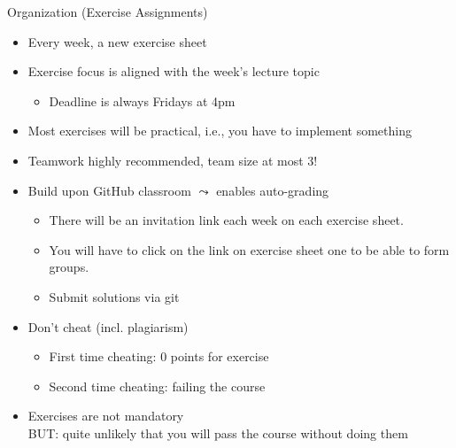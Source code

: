 \documentclass[aspectratio=169]{../latex_main/tntbeamer}  %
\begin{document}
\begin{frame}[c]{Organization (Exercise Assignments)}
	
	\begin{itemize}
	\item Every week, a new exercise sheet
		\item Exercise focus is aligned with the week's lecture topic
		\begin{itemize}
		    \item \alert{Deadline} is always Fridays at 4pm
		\end{itemize}
		\item Most exercises will be practical, i.e., you have to implement something
		\item Teamwork highly recommended, team size at most 3! 
		\pause
		\item Build upon GitHub classroom $\leadsto$ enables auto-grading
		\begin{itemize}
			\item There will be an invitation link each week on each exercise sheet.
			\item You will have to click on the link on exercise sheet one to be able to form groups.
			\item Submit solutions via git
		\end{itemize}
		\pause
            \item Don't cheat (incl. plagiarism)
            \begin{itemize}
              \item First time cheating: $0$ points for exercise
              \item Second time cheating: failing the course
            \end{itemize}
            \pause
            \item Exercises are not mandatory\\ \alert{BUT: quite unlikely that you will pass the course without doing them}
	\end{itemize}
	
\end{frame}
\end{document}
